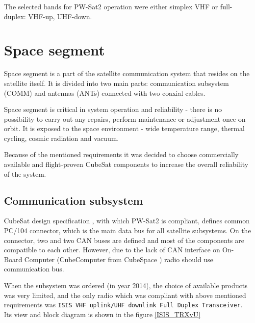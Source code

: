 The selected bands for PW-Sat2 operation were either simplex VHF or full-duplex: VHF-up, UHF-down.


\section{Space segment}
Space segment is a part of the satellite communication system that resides on the satellite itself. It is divided into two main parts: communication subsystem (COMM) and antennas (ANTs) connected with two coaxial cables.

Space segment is critical in system operation and reliability - there is no possibility to carry out any repairs, perform maintenance or adjustment once on orbit. It is exposed to the space environment - wide temperature range, thermal cycling, cosmic radiation and vacuum.

Because of the mentioned requirements it was decided to choose commercially available and flight-proven CubeSat components to increase the overall reliability of the system.

\subsection{Communication subsystem}
CubeSat design specification \cite{cubesat_spec}, with which PW-Sat2 is compliant, defines common PC/104 connector, which is the main data bus for all satellite subsystems. On the connector, two \iic and two CAN buses are defined and most of the components are compatible to each other. However, due to the lack of CAN interface on On-Board Computer (CubeComputer from CubeSpace \cite{cubespace_website}) radio should use \iic communication bus.

When the subsystem was ordered (in year \si{2014}), the choice of available products was very limited, and the only radio which was compliant with above mentioned requirements was \texttt{ISIS VHF uplink/UHF downlink Full Duplex Transceiver}. Its view and block diagram is shown in the figure \ref{ISIS_TRXvU}

